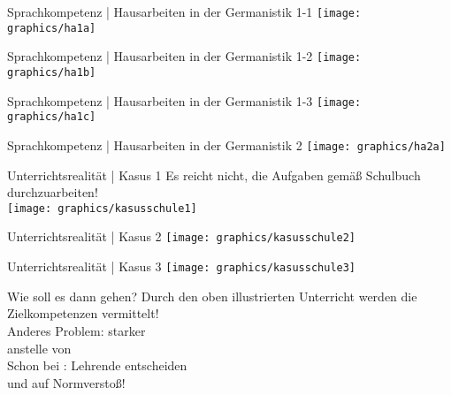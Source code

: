 \begin{frame}
  {Sprachkompetenz | Hausarbeiten in der Germanistik 1-1}
  \onslide<+->
  \onslide<+->
  \centering 
  \texttt{[image: graphics/ha1a]}
\end{frame}

\begin{frame}
  {Sprachkompetenz | Hausarbeiten in der Germanistik 1-2}
  \centering 
  \texttt{[image: graphics/ha1b]}
\end{frame}

\begin{frame}
  {Sprachkompetenz | Hausarbeiten in der Germanistik 1-3}
  \centering 
  \texttt{[image: graphics/ha1c]}
\end{frame}

\begin{frame}
  {Sprachkompetenz | Hausarbeiten in der Germanistik 2}
  \centering 
  \texttt{[image: graphics/ha2a]}
\end{frame}


\begin{frame}
  {Unterrichtsrealität | Kasus 1}
  Es reicht nicht, die Aufgaben gemäß Schulbuch durchzuarbeiten!\\
  \Halbzeile
  \centering 
  \onslide<+->
  \onslide<+->
  \texttt{[image: graphics/kasusschule1]}\\
\end{frame}

\begin{frame}
  {Unterrichtsrealität | Kasus 2}
  \centering 
  \texttt{[image: graphics/kasusschule2]}\\
\end{frame}

\begin{frame}
  {Unterrichtsrealität | Kasus 3}
  \centering 
  \texttt{[image: graphics/kasusschule3]}\\
\end{frame}

\begin{frame}
  {Wie soll es dann gehen?}
  \onslide<+->
  \onslide<+->
  \centering 
  Durch den oben illustrierten Unterricht werden die Zielkompetenzen  vermittelt!\\
  \onslide<+->
  \Zeile
  \Large Anderes Problem: starker \\
  anstelle von \\
  \Zeile
  \onslide<+->
  \normalsize
  Schon bei \citet{Braun1979}: Lehrende entscheiden \\
  und  auf Normverstoß!
\end{frame}

